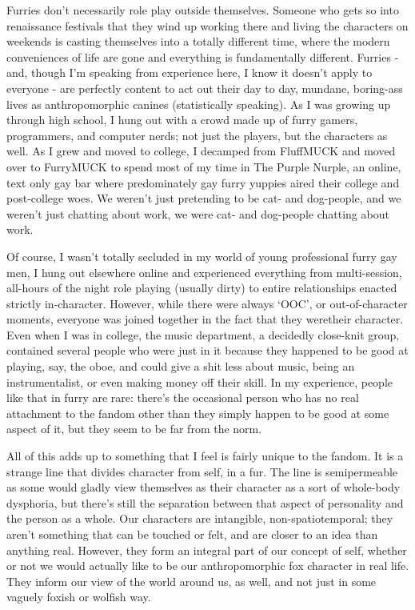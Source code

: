 Furries don't necessarily role play outside themselves. Someone who gets so into renaissance festivals that they wind up working there and living the characters on weekends is casting themselves into a totally different time, where the modern conveniences of life are gone and everything is fundamentally different. Furries - and, though I'm speaking from experience here, I know it doesn't apply to everyone - are perfectly content to act out their day to day, mundane, boring-ass lives as anthropomorphic canines (statistically speaking). As I was growing up through high school, I hung out with a crowd made up of furry gamers, programmers, and computer nerds; not just the players, but the characters as well. As I grew and moved to college, I decamped from FluffMUCK and moved over to FurryMUCK to spend most of my time in The Purple Nurple, an online, text only gay bar where predominately gay furry yuppies aired their college and post-college woes. We weren't just pretending to be cat- and dog-people, and we weren't just chatting about work, we were cat- and dog-people chatting about work.

Of course, I wasn't totally secluded in my world of young professional furry gay men, I hung out elsewhere online and experienced everything from multi-session, all-hours of the night role playing (usually dirty) to entire relationships enacted strictly in-character. However, while there were always `OOC', or out-of-character moments, everyone was joined together in the fact that they weretheir character. Even when I was in college, the music department, a decidedly close-knit group, contained several people who were just in it because they happened to be good at playing, say, the oboe, and could give a shit less about music, being an instrumentalist, or even making money off their skill. In my experience, people like that in furry are rare: there's the occasional person who has no real attachment to the fandom other than they simply happen to be good at some aspect of it, but they seem to be far from the norm.

All of this adds up to something that I feel is fairly unique to the fandom. It is a strange line that divides character from self, in a fur. The line is semipermeable as some would gladly view themselves as their character as a sort of whole-body dysphoria, but there's still the separation between that aspect of personality and the person as a whole. Our characters are intangible, non-spatiotemporal; they aren't something that can be touched or felt, and are closer to an idea than anything real. However, they form an integral part of our concept of self, whether or not we would actually like to be our anthropomorphic fox character in real life. They inform our view of the world around us, as well, and not just in some vaguely foxish or wolfish way.

